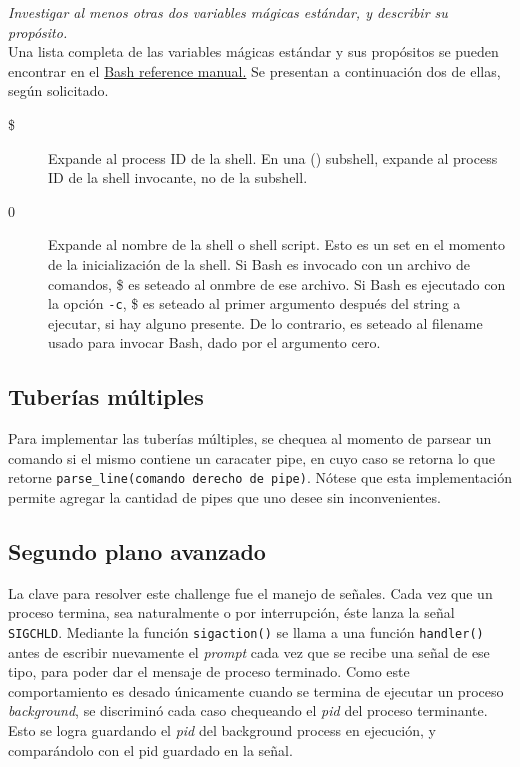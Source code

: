 \documentclass{article}
\begin{document}


\textit{Investigar al menos otras dos variables mágicas estándar, y describir su propósito.}\\

Una lista completa de las variables mágicas estándar y sus propósitos se pueden encontrar en el \href{https://www.gnu.org/software/bash/manual/html\_node/Variable-Index.html}{Bash reference manual.} Se presentan a continuación dos de ellas, según solicitado.\\

\begin{description}
    \item[\$] Expande al process ID de la shell. En una () subshell, expande al process ID de la shell invocante, no de la subshell.
    \item[0] Expande al nombre de la shell o shell script. Esto es un set en el momento de la inicialización de la shell. Si Bash es invocado con un archivo de comandos, \$ es seteado al onmbre de ese archivo. Si Bash es ejecutado con la opción \texttt{-c}, \$ es seteado al primer argumento después del string a ejecutar, si hay alguno presente. De lo contrario, es seteado al filename usado para invocar Bash, dado por el argumento cero.
\end{description}

\subsection{Tuberías múltiples}
Para implementar las tuberías múltiples, se chequea al momento de parsear un comando si el mismo contiene un caracater pipe, en cuyo caso se retorna lo que retorne \texttt{parse\_line(comando derecho de pipe)}. Nótese que esta implementación permite agregar la cantidad de pipes que uno desee sin inconvenientes.



\subsection{Segundo plano avanzado}
La clave para resolver este challenge fue el manejo de señales. Cada vez que un proceso termina, sea naturalmente o por interrupción, éste lanza la señal \texttt{SIGCHLD}. Mediante la función  \texttt{sigaction()} se llama a una función \texttt{handler()} antes de escribir nuevamente el \textit{prompt} cada vez que se recibe una señal de ese tipo, para poder dar el mensaje de proceso terminado. Como este comportamiento es desado únicamente cuando se termina de ejecutar un proceso \textit{background}, se discriminó cada caso chequeando el \textit{pid} del proceso terminante. Esto se logra guardando el \textit{pid} del background process en ejecución, y comparándolo con el pid guardado en la señal. 
\end{document}
